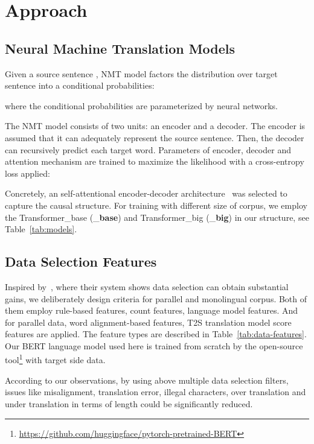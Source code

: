\documentclass[11pt,a4paper]{article}
\begin{document}
\section{Approach}
\label{sec:app}

\subsection{Neural Machine Translation Models}
\label{ssec:nmt}

Given a source sentence , NMT model factors the distribution over target sentence  into a conditional probabilities:

where the conditional probabilities are parameterized by neural networks. 

The NMT model consists of two units: an encoder and a decoder. The encoder is assumed that it can adequately represent the source sentence. Then, the decoder can recursively predict each target word. Parameters of encoder, decoder and attention mechanism are trained to maximize the likelihood with a cross-entropy loss applied:



Concretely, an self-attentional encoder-decoder architecture~\cite{transformer} was selected to capture the causal structure. For training with different size of corpus, we employ the Transformer\_base (\_{\textbf{base}}) and Transformer\_big (\_{\textbf{big}}) in our structure, see Table~\ref{tab:models}.


\subsection{Data Selection Features}
\label{ssec:data}

Inspired by~\cite{bei-etal-2018-empirical}, where their system shows data selection can obtain substantial gains, we deliberately design criteria for parallel and monolingual corpus. Both of them employ rule-based features, count features, language model features. And for parallel data, word alignment-based features, T2S translation model score features are applied. The feature types are described in Table~\ref{tab:data-features}. Our BERT language model used here is trained from scratch by the open-source tool\footnote{\url{https://github.com/huggingface/pytorch-pretrained-BERT}} with target side data.

According to our observations, by using above multiple data selection filters, issues like misalignment, translation error, illegal characters, over translation and under translation in terms of length could be significantly reduced.
\end{document}
